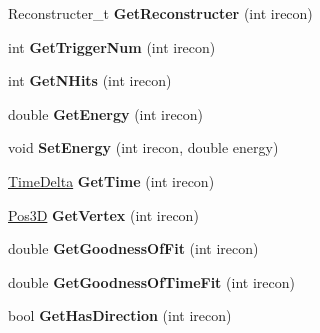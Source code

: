 \begin{DoxyCompactItemize}
\item 
\hypertarget{classReconInfo_a4cbe5c22fdb5ccb337e91b636770c8d8}{Reconstructer\-\_\-t {\bfseries Get\-Reconstructer} (int irecon)}\label{classReconInfo_a4cbe5c22fdb5ccb337e91b636770c8d8}

\item 
\hypertarget{classReconInfo_a6bf88674ba47e30e004ec39179806575}{int {\bfseries Get\-Trigger\-Num} (int irecon)}\label{classReconInfo_a6bf88674ba47e30e004ec39179806575}

\item 
\hypertarget{classReconInfo_a9e34f7e22595b583f6b70749cf3321b6}{int {\bfseries Get\-N\-Hits} (int irecon)}\label{classReconInfo_a9e34f7e22595b583f6b70749cf3321b6}

\item 
\hypertarget{classReconInfo_ac19bad0f4af4dabb4e8517181f670795}{double {\bfseries Get\-Energy} (int irecon)}\label{classReconInfo_ac19bad0f4af4dabb4e8517181f670795}

\item 
\hypertarget{classReconInfo_ae54737e4ec00e103cfd214dafa6b6313}{void {\bfseries Set\-Energy} (int irecon, double energy)}\label{classReconInfo_ae54737e4ec00e103cfd214dafa6b6313}

\item 
\hypertarget{classReconInfo_ac98f1d0a6be5e2ae54ea209022bad403}{\hyperlink{classTimeDelta}{Time\-Delta} {\bfseries Get\-Time} (int irecon)}\label{classReconInfo_ac98f1d0a6be5e2ae54ea209022bad403}

\item 
\hypertarget{classReconInfo_a3b0e7457d82ba538556e377e5a67ebe2}{\hyperlink{structPos3D}{Pos3\-D} {\bfseries Get\-Vertex} (int irecon)}\label{classReconInfo_a3b0e7457d82ba538556e377e5a67ebe2}

\item 
\hypertarget{classReconInfo_a62fdfb94f15d32711fb78db2dfdf8c84}{double {\bfseries Get\-Goodness\-Of\-Fit} (int irecon)}\label{classReconInfo_a62fdfb94f15d32711fb78db2dfdf8c84}

\item 
\hypertarget{classReconInfo_a453dae55666b27b10a8d13aba3112b93}{double {\bfseries Get\-Goodness\-Of\-Time\-Fit} (int irecon)}\label{classReconInfo_a453dae55666b27b10a8d13aba3112b93}

\item 
\hypertarget{classReconInfo_ac4f154d184b7645943955f507281672e}{bool {\bfseries Get\-Has\-Direction} (int irecon)}\label{classReconInfo_ac4f154d184b7645943955f507281672e}


\end{DoxyCompactItemize}
